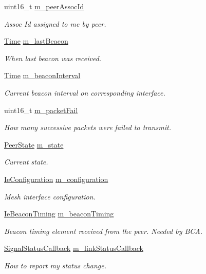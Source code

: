 \begin{DoxyCompactItemize}
uint16\+\_\+t \hyperlink{classns3_1_1dot11s_1_1PeerLink_a732db7f1857d5f3a56d5c5fccbe66cb4}{m\+\_\+peer\+Assoc\+Id}
\begin{DoxyCompactList}\small\item\em Assoc Id assigned to me by peer. \end{DoxyCompactList}\item 
\hyperlink{classns3_1_1Time}{Time} \hyperlink{classns3_1_1dot11s_1_1PeerLink_a025e3907d1183e71a14698bea36cf0b0}{m\+\_\+last\+Beacon}
\begin{DoxyCompactList}\small\item\em When last beacon was received. \end{DoxyCompactList}\item 
\hyperlink{classns3_1_1Time}{Time} \hyperlink{classns3_1_1dot11s_1_1PeerLink_a859fc614180a0aa59e85a2d50df4dfc1}{m\+\_\+beacon\+Interval}
\begin{DoxyCompactList}\small\item\em Current beacon interval on corresponding interface. \end{DoxyCompactList}\item 
uint16\+\_\+t \hyperlink{classns3_1_1dot11s_1_1PeerLink_ae49bf34d417c48dcd6747b62d7b9499b}{m\+\_\+packet\+Fail}
\begin{DoxyCompactList}\small\item\em How many successive packets were failed to transmit. \end{DoxyCompactList}\item 
\hyperlink{classns3_1_1dot11s_1_1PeerLink_a432024c7d584aebae1ee15aa88ffb06d}{Peer\+State} \hyperlink{classns3_1_1dot11s_1_1PeerLink_a787dbb5c8b201a6f0bb92650b67807ef}{m\+\_\+state}
\begin{DoxyCompactList}\small\item\em Current state. \end{DoxyCompactList}\item 
\hyperlink{classns3_1_1dot11s_1_1IeConfiguration}{Ie\+Configuration} \hyperlink{classns3_1_1dot11s_1_1PeerLink_ab8f2b72136504a51c86d05c1e156301e}{m\+\_\+configuration}
\begin{DoxyCompactList}\small\item\em Mesh interface configuration. \end{DoxyCompactList}\item 
\hyperlink{classns3_1_1dot11s_1_1IeBeaconTiming}{Ie\+Beacon\+Timing} \hyperlink{classns3_1_1dot11s_1_1PeerLink_abfb0c6a6fd9e29b337f539eaf97f5337}{m\+\_\+beacon\+Timing}
\begin{DoxyCompactList}\small\item\em Beacon timing element received from the peer. Needed by B\+CA. \end{DoxyCompactList}\item 
\hyperlink{classns3_1_1dot11s_1_1PeerLink_a21075852eb44ac64164a4c977262bf9f}{Signal\+Status\+Callback} \hyperlink{classns3_1_1dot11s_1_1PeerLink_aa3cadbb1c5ea5b1b70bf0e4d0bf1dcdd}{m\+\_\+link\+Status\+Callback}
\begin{DoxyCompactList}\small\item\em How to report my status change. \end{DoxyCompactList}\end{DoxyCompactItemize}
